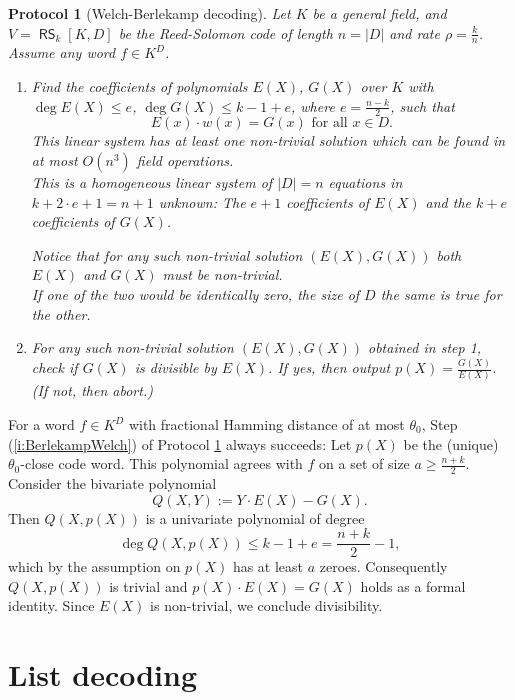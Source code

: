 \documentclass[11pt,article,oneside]{memoir}
\newtheorem{protocol}[]{Protocol}
\theoremstyle{definition}
\theoremstyle{remark}
\DeclareMathOperator{\RS}{\mathsf{RS}}
\begin{document}
\begin{protocol}[Welch-Berlekamp decoding]
\label{p:BerlekampWelch} 
Let $K$ be a general field, and $V=\RS_k[K,D]$ be the Reed-Solomon code  of length $n= |D|$ and rate $\rho = \frac{k}{n}$.  
Assume any word $f\in K^D$. 
\begin{enumerate}
\item 
Find the coefficients of polynomials $E(X)$, $G(X)$ over $K$ with $\deg E(X)\leq e$, $\deg G(X)\leq k-1+e$, where $e=\frac{n-k}{2}$, such that
\[
	E(x)\cdot w(x) = G(x) \text{ for all } x\in D.
\] 
This linear system has at least one non-trivial solution which can be found in at most $O\left(n^3\right)$ field operations.
\\
{\tiny
This is a homogeneous linear system of $|D|=n$ equations in $k+2\cdot e+1=n+1$ unknown: 
The $e+1$ coefficients of $E(X)$ and the $k+e$ coefficients of $G(X)$.
}

Notice that for any such non-trivial solution $(E(X),G(X))$ both $E(X)$ and $G(X)$ must be non-trivial. 
\\
{\tiny
If one of the two would be identically zero, the size of $D$ the same is true for the other.
}

\item
\label{i:BerlekampWelch}
For any such non-trivial solution $(E(X),G(X))$ obtained in step 1, check if $G(X)$ is divisible by $E(X)$. 
If yes, then output $p(X)= \frac{G(X)}{E(X)}$.  
(If not, then abort.)
\end{enumerate}
\end{protocol}

For a word $f\in K^D$ with fractional Hamming distance of at most $\theta_0$, Step (\ref{i:BerlekampWelch}) of Protocol \ref{p:BerlekampWelch} always succeeds: 
Let $p(X)$ be the (unique) $\theta_0$-close code word. 
This polynomial agrees with $f$ on a set of size $a\geq\frac{n+k}{2}$. 
Consider the bivariate polynomial
\[
Q(X,Y):= Y\cdot E(X)-G(X). 
\]
Then $Q(X,p(X))$ is a univariate polynomial of degree 
\[
\deg Q(X,p(X)) \leq k-1+e =\frac{n+k}{2} - 1,
\] 
which by the assumption on $p(X)$ has at least $a$ zeroes. 
Consequently $Q(X,p(X))$ is trivial and $p(X)\cdot E(X)=G(X)$ holds as a formal identity. 
Since $E(X)$ is non-trivial, we conclude divisibility. 



\section{List decoding}
\label{s:ListDecoding}
\end{document}
